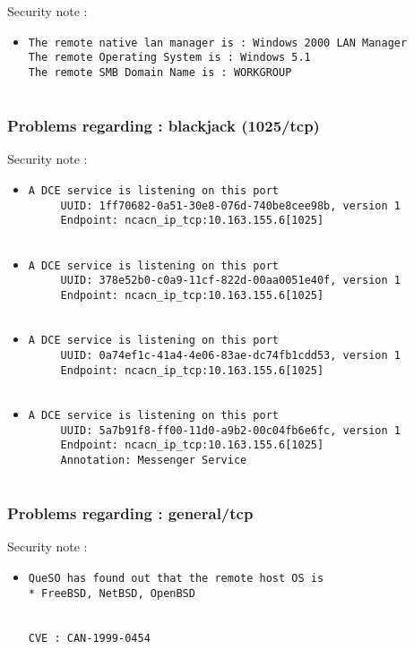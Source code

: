 \documentclass{article}
\begin{document}
Security note :\\
\begin{itemize}
\item \begin{verbatim}
The remote native lan manager is : Windows 2000 LAN Manager
The remote Operating System is : Windows 5.1
The remote SMB Domain Name is : WORKGROUP


\end{verbatim}\end{itemize}
\subsubsection{Problems regarding : blackjack (1025/tcp)}
Security note :\\
\begin{itemize}
\item \begin{verbatim}
A DCE service is listening on this port
     UUID: 1ff70682-0a51-30e8-076d-740be8cee98b, version 1
     Endpoint: ncacn_ip_tcp:10.163.155.6[1025]


\end{verbatim}\item \begin{verbatim}
A DCE service is listening on this port
     UUID: 378e52b0-c0a9-11cf-822d-00aa0051e40f, version 1
     Endpoint: ncacn_ip_tcp:10.163.155.6[1025]


\end{verbatim}\item \begin{verbatim}
A DCE service is listening on this port
     UUID: 0a74ef1c-41a4-4e06-83ae-dc74fb1cdd53, version 1
     Endpoint: ncacn_ip_tcp:10.163.155.6[1025]


\end{verbatim}\item \begin{verbatim}
A DCE service is listening on this port
     UUID: 5a7b91f8-ff00-11d0-a9b2-00c04fb6e6fc, version 1
     Endpoint: ncacn_ip_tcp:10.163.155.6[1025]
     Annotation: Messenger Service


\end{verbatim}\end{itemize}
\subsubsection{Problems regarding : general/tcp}
Security note :\\
\begin{itemize}
\item \begin{verbatim}
QueSO has found out that the remote host OS is 
* FreeBSD, NetBSD, OpenBSD  


CVE : CAN-1999-0454
\end{verbatim}\end{itemize}
\end{document}
